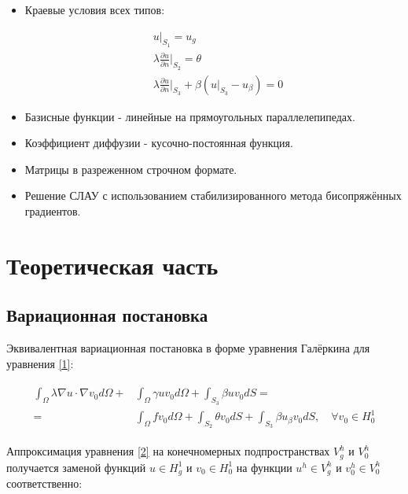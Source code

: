 \documentclass[12pt, a4paper]{article}
\begin{document}
\begin{itemize}
\item Краевые условия всех типов:

\begin{fleqn}[20pt]
\begin{align}
  &u|_{S_1} = u_g \\[1ex]
  &\lambda \frac{\partial{u}}{\partial{n}}\bigg\rvert_{S_2} = \theta \\[1ex]
  &\lambda \frac{\partial{u}}{\partial{n}}\bigg\rvert_{S_3} + 
    \beta (u\rvert_{S_3} - u_{\beta}) = 0
\end{align}
\end{fleqn}

\item Базисные функции - линейные на прямоугольных параллелепипедах.
\item Коэффициент диффузии - кусочно-постоянная функция.
\item Матрицы в разреженном строчном формате.
\item Решение СЛАУ с использованием стабилизированного метода бисопряжённых градиентов.
\end{itemize}

\section{Теоретическая часть}
\subsection{Вариационная постановка}

Эквивалентная вариационная постановка в форме уравнения Галёркина
для уравнения \ref{1}:

\begin{align}
  \begin{split}\label{2}
     \int_{\Omega}\lambda\nabla{u}\cdot\nabla{v_0}d\Omega 
  + &\int_{\Omega}\gamma u v_0 d\Omega
  +  \int_{S_3}\beta u v_0 dS = \\
  = &\int_{\Omega}fv_0d\Omega + 
       \int_{S_2}\theta v_0dS + 
       \int_{S_3}\beta u_{\beta}v_0dS,
      \quad \forall v_0 \in H_0^1
  \end{split}
\end{align}

\noindent Аппроксимация уравнения \ref{2} на конечномерных подпространствах $V_g^h$ и $V_0^h$ 
получается заменой функций $u \in H_g^1$ и $v_0 \in H_0^1$ 
на функции $u^h \in V_g^h$ и $v_0^h \in V_0^h$ соответственно:
\end{document}
